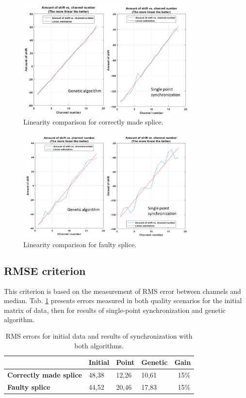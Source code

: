 \documentclass[applsci,article,preprint,moreauthors,pdftex]{Definitions/mdpi}
\begin{document}
\begin{figure}[ht!]
\centering
\includegraphics[width=0.8\textwidth]{figs/lin.png}
\caption{Linearity comparison for correctly made splice.}
\label{fig:lin}
\end{figure}

\begin{figure}[ht!]
\centering
\includegraphics[width=0.8\textwidth]{figs/lin2.png}
\caption{Linearity comparison for faulty splice.}
\label{fig:lin2}
\end{figure}

\subsection{RMSE criterion}

This criterion is based on the measurement of RMS error between channels and median. Tab. \ref{tab:tab3} presents errors measured in both quality scenarios for the initial matrix of data, then for results of single-point synchronization and genetic algorithm.

\begin{table}[ht!]
    \centering
    \caption{RMS errors for initial data and results of synchronization with both algorithms.}
    \begin{tabular}{|l|l|l|l|l|}
    \hline
         & \textbf{Initial} & \textbf{Point} & \textbf{Genetic} & \textbf{Gain} \\ \hline
          \textbf{Correctly made splice} & 48,38 & 12,26 & 10,61 & ~15\% \\ \hline
          \textbf{Faulty splice} & 44,52 & 20,46 & 17,83 & ~15\% \\ 
    \hline
    \end{tabular}
    \label{tab:tab3}
\end{table}
\end{document}
